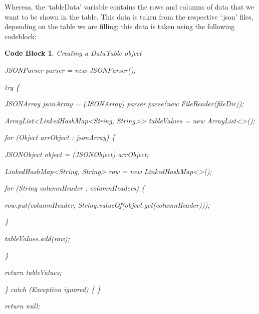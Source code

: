 \documentclass[12pt, a4paper, oneside]{book}
\newtheorem{codeblock}[theorem]{Code Block}
\numberwithin{equation}{section}
\begin{document}
Whereas, the `tableData' variable contains the rows and columns of data that we want to be shown in the table. This data is taken from the respective `.json' files, depending on the table we are filling; this data is taken using the following codeblock:

\begin{codeblock} \label{Creating a DataTable object}
  Creating a DataTable object

  JSONParser parser = new JSONParser();

  try \{

  \hspace{\parindent}JSONArray jsonArray = (JSONArray) parser.parse(new FileReader(fileDir));

  \hspace{\parindent}ArrayList<LinkedHashMap<String, String>> tableValues = new ArrayList<>();

  \hspace{\parindent}for (Object arrObject : jsonArray) \{

  \hspace{\parindent}\hspace{\parindent}JSONObject object = (JSONObject) arrObject;

  \hspace{\parindent}\hspace{\parindent}LinkedHashMap<String, String> row = new LinkedHashMap<>();

  \hspace{\parindent}\hspace{\parindent}for (String columnHeader : columnHeaders) \{

  \hspace{\parindent}\hspace{\parindent}\hspace{\parindent}row.put(columnHeader, String.valueOf(object.get(columnHeader)));

  \hspace{\parindent}\hspace{\parindent}\}

  \hspace{\parindent}\hspace{\parindent}tableValues.add(row);

  \hspace{\parindent}\}

  \hspace{\parindent}return tableValues;

  \} catch (Exception ignored) \{ \}

  return null;
\end{codeblock}
\end{document}
